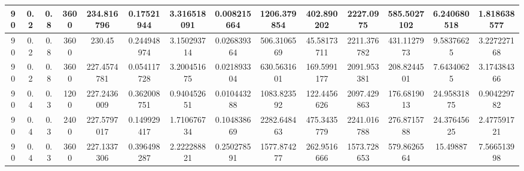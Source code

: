 \documentclass[main.tex]{subfiles}
\begin{document}
\begin{table}[ht]
\begin{tabular}{cccccccccccccc}
		\multicolumn{1}{|c|}{90} & \multicolumn{1}{c|}{0.2} & \multicolumn{1}{c|}{0.8} & \multicolumn{1}{c|}{3600} & \multicolumn{1}{c|}{234.816796}  & \multicolumn{1}{c|}{0.17521944}  & \multicolumn{1}{c|}{3.316518091} & \multicolumn{1}{c|}{0.008215664} & \multicolumn{1}{c|}{1206.379854} & \multicolumn{1}{c|}{402.890202}  & \multicolumn{1}{c|}{2227.0975}   & \multicolumn{1}{c|}{585.5027102} & \multicolumn{1}{c|}{6.240680518} & \multicolumn{1}{c|}{1.818638577} \\ \hline
		\multicolumn{1}{|c|}{90} & \multicolumn{1}{c|}{0.2} & \multicolumn{1}{c|}{0.8} & \multicolumn{1}{c|}{3600} & \multicolumn{1}{c|}{230.45}      & \multicolumn{1}{c|}{0.244948974} & \multicolumn{1}{c|}{3.150293714} & \multicolumn{1}{c|}{0.026839364} & \multicolumn{1}{c|}{506.3106569} & \multicolumn{1}{c|}{45.58173711} & \multicolumn{1}{c|}{2211.376782} & \multicolumn{1}{c|}{431.1127973} & \multicolumn{1}{c|}{9.58376625}  & \multicolumn{1}{c|}{3.227227168} \\ \hline
		\multicolumn{1}{|c|}{90} & \multicolumn{1}{c|}{0.2} & \multicolumn{1}{c|}{0.8} & \multicolumn{1}{c|}{3600} & \multicolumn{1}{c|}{227.4574781} & \multicolumn{1}{c|}{0.054117728} & \multicolumn{1}{c|}{3.200451675} & \multicolumn{1}{c|}{0.021893304} & \multicolumn{1}{c|}{630.5631601} & \multicolumn{1}{c|}{169.5991177} & \multicolumn{1}{c|}{2091.953381} & \multicolumn{1}{c|}{208.8244501} & \multicolumn{1}{c|}{7.64340625}  & \multicolumn{1}{c|}{3.174384366} \\ \hline
		\multicolumn{1}{|c|}{90} & \multicolumn{1}{c|}{0.4} & \multicolumn{1}{c|}{0.3} & \multicolumn{1}{c|}{1200} & \multicolumn{1}{c|}{227.2436009} & \multicolumn{1}{c|}{0.362008751} & \multicolumn{1}{c|}{0.940452651} & \multicolumn{1}{c|}{0.010443288} & \multicolumn{1}{c|}{1083.823592} & \multicolumn{1}{c|}{122.4456626} & \multicolumn{1}{c|}{2097.429863} & \multicolumn{1}{c|}{176.6819013} & \multicolumn{1}{c|}{24.95831875} & \multicolumn{1}{c|}{0.904229782} \\ \hline
		\multicolumn{1}{|c|}{90} & \multicolumn{1}{c|}{0.4} & \multicolumn{1}{c|}{0.3} & \multicolumn{1}{c|}{2400} & \multicolumn{1}{c|}{227.5797017} & \multicolumn{1}{c|}{0.149929417} & \multicolumn{1}{c|}{1.710676734} & \multicolumn{1}{c|}{0.104838669} & \multicolumn{1}{c|}{2282.648463} & \multicolumn{1}{c|}{475.3435779} & \multicolumn{1}{c|}{2241.016788} & \multicolumn{1}{c|}{276.8715788} & \multicolumn{1}{c|}{24.37645625} & \multicolumn{1}{c|}{2.477591721} \\ \hline
		\multicolumn{1}{|c|}{90} & \multicolumn{1}{c|}{0.4} & \multicolumn{1}{c|}{0.3} & \multicolumn{1}{c|}{3600} & \multicolumn{1}{c|}{227.1337306} & \multicolumn{1}{c|}{0.396498287} & \multicolumn{1}{c|}{2.222288821} & \multicolumn{1}{c|}{0.250278591} & \multicolumn{1}{c|}{1577.874277} & \multicolumn{1}{c|}{262.9516666} & \multicolumn{1}{c|}{1573.728653} & \multicolumn{1}{c|}{579.8626564} & \multicolumn{1}{c|}{15.49887}    & \multicolumn{1}{c|}{7.566513998} \\ \hline

\end{tabular}
\end{table}
\end{document}
